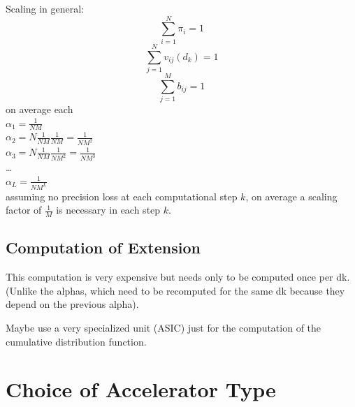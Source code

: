 \documentclass[mscthesis]{usiinfthesis}
\begin{document}
Scaling in general:
\begin{equation}
    \sum\limits_{i=1}^{N} \pi_i = 1
\end{equation}
\begin{equation}
    \sum\limits_{j=1}^{N} v_{ij}(d_k) = 1
\end{equation}
\begin{equation}
    \sum\limits_{j=1}^{M} b_{ij} = 1
\end{equation}
on average each\\
$ \alpha_1 = \frac{1}{NM} $\\
$ \alpha_2 = N\frac{1}{NM}\frac{1}{NM} = \frac{1}{NM^2} $\\
$ \alpha_3 = N\frac{1}{NM}\frac{1}{NM^2} = \frac{1}{NM^3} $\\
\dots\\
$ \alpha_L = \frac{1}{NM^L} $\\
assuming no precision loss at each computational step $ k $, on average a
scaling factor of $ \frac{1}{M} $ is necessary in each step $ k $.

\subsection{Computation of Extension}
This computation is very expensive but needs only to be computed once per dk.
(Unlike the alphas, which need to be recomputed for the same dk because they
depend on the previous alpha).

Maybe use a very specialized unit (ASIC) just for the computation of the
cumulative distribution function.

\section{Choice of Accelerator Type}
\label{ch:acc_choice}

\end{document}
